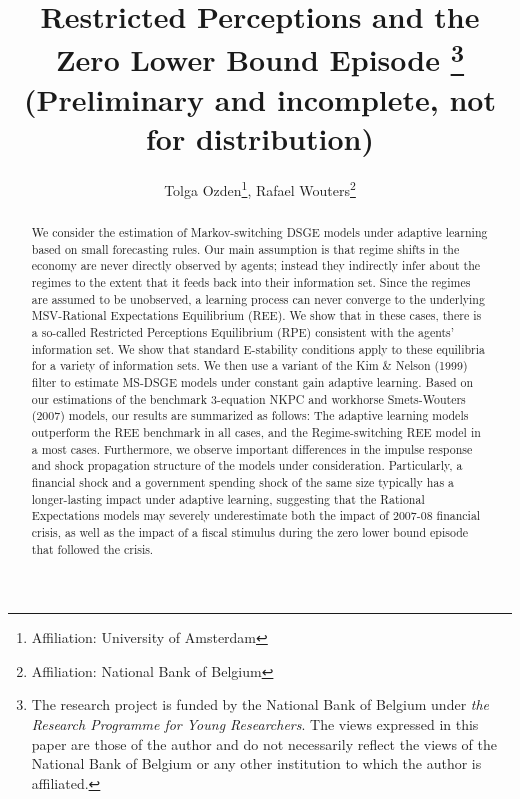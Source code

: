 \documentclass[12pt,reqno]{article}
\title{Restricted Perceptions and the Zero Lower Bound Episode \footnote{The research project is funded by the National Bank of Belgium under \textit{the Research Programme for Young Researchers}. The views expressed in this paper are those of the author and do not necessarily reflect the views 
of the National Bank of Belgium or any other institution to which the author is affiliated.}\vspace{10 mm} \\ (Preliminary and incomplete, not for distribution) }
\author{Tolga Ozden\footnote{Affiliation: University of Amsterdam}, Rafael Wouters\footnote{Affiliation: National Bank of Belgium}}
\numberwithin{equation}{section}
\begin{document}
\maketitle

\begin{abstract}

We consider the estimation of Markov-switching DSGE models under adaptive learning based on small forecasting rules. Our main assumption is that regime shifts in the economy are never directly observed by agents; instead they indirectly infer about the regimes to the extent that it feeds back into their information set. Since the regimes are assumed to be unobserved, a learning process can never converge to the underlying MSV-Rational Expectations Equilibrium (REE). We show that in these cases, there is a so-called Restricted Perceptions Equilibrium (RPE) consistent with the agents' information set. We show that standard E-stability conditions apply to these equilibria for a variety of information sets. We then use a variant of the Kim \& Nelson (1999) filter to estimate MS-DSGE models under constant gain adaptive learning. Based on our estimations of the benchmark 3-equation NKPC and workhorse Smets-Wouters (2007) models, our results are summarized as follows: The adaptive learning models outperform the REE benchmark in all cases, and the Regime-switching REE model in a most cases. Furthermore, we observe important differences in the impulse response and shock propagation structure of the models under consideration. Particularly, a financial shock and a government spending shock of the same size typically has a longer-lasting impact under adaptive learning, suggesting that the Rational Expectations models may severely underestimate both the impact of 2007-08 financial crisis, as well as the impact of a fiscal stimulus during the zero lower bound episode that followed the crisis.  

\end{abstract}
\end{document}
